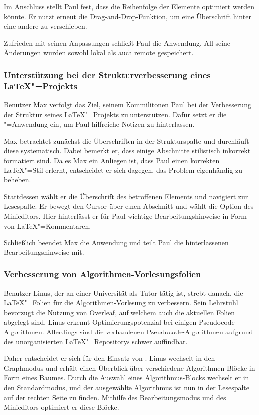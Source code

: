 Im Anschluss stellt Paul fest, dass die Reihenfolge der Elemente optimiert werden könnte.
Er nutzt erneut die Drag-and-Drop-Funktion, um eine Überschrift hinter eine andere zu verschieben.

Zufrieden mit seinen Anpassungen schließt Paul die Anwendung.
All seine Änderungen wurden sowohl lokal als auch remote gespeichert.

\subsubsection{Unterstützung bei der Strukturverbesserung eines \LaTeX"=Projekts}

Benutzer Max verfolgt das Ziel, seinem Kommilitonen Paul bei der Verbesserung der Struktur seines
\LaTeX"=Projekts zu unterstützen.
Dafür setzt er die \texla"=Anwendung ein, um Paul hilfreiche Notizen zu hinterlassen.

Max betrachtet zunächst die Überschriften in der Strukturspalte und durchläuft diese systematisch.
Dabei bemerkt er, dass einige Abschnitte stilistisch inkorrekt formatiert sind.
Da es Max ein Anliegen ist, dass Paul einen korrekten \LaTeX"=Stil erlernt, entscheidet
er sich dagegen, das Problem eigenhändig zu beheben.

Stattdessen wählt er die Überschrift des betroffenen Elements und navigiert zur Lesespalte.
Er bewegt den Cursor über einen Abschnitt und wählt die Option des Minieditors.
Hier hinterlässt er für Paul wichtige Bearbeitungshinweise in Form von \LaTeX"=Kommentaren.

Schließlich beendet Max die Anwendung und teilt Paul die hinterlassenen Bearbeitungshinweise mit.

\subsubsection{Verbesserung von Algorithmen-Vorlesungsfolien}

Benutzer Linus, der an einer Universität als Tutor tätig ist, strebt danach, die \LaTeX"=Folien für die
Algorithmen-Vorlesung zu verbessern.
Sein Lehrstuhl bevorzugt die Nutzung von Overleaf, auf welchem auch die aktuellen Folien abgelegt sind.
Linus erkennt Optimierungspotenzial bei einigen Pseudocode-Algorithmen.
Allerdings sind die vorhandenen Pseudocode-Algorithmen aufgrund des unorganisierten \LaTeX"=Repositorys schwer
auffindbar.

Daher entscheidet er sich für den Einsatz von \texla{}.
Linus wechselt in den Graphmodus und erhält einen Überblick
über verschiedene Algorithmen-Blöcke in Form eines Baumes.
Durch die Auswahl eines Algorithmus-Blocks wechselt er in den
Standardmodus, und der ausgewählte Algorithmus ist nun in der Lesespalte auf der rechten Seite zu finden.
Mithilfe des Bearbeitungsmodus und des Minieditors optimiert er diese Blöcke.

